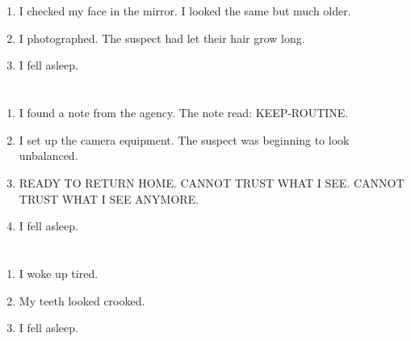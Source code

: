 \documentclass{article}
\begin{document}
    \section{}
    
    \begin{enumerate}
    
    \item I checked my face in the mirror. I looked the same but much older.\\
    
    \item I photographed. The suspect had let their hair grow long.\\
    
    \item I fell asleep.\\
    
    \end{enumerate}
     
    \newpage
    
    \section{}
    
    \begin{enumerate}
    
    \item I found a note from the agency. The note read: KEEP-ROUTINE.\\
    
    \item I set up the camera equipment. The suspect was beginning to look unbalanced.\\
    
    \item READY TO RETURN HOME. CANNOT TRUST WHAT I SEE. CANNOT TRUST WHAT I SEE ANYMORE.\\
    
    \item I fell asleep.\\
    
    \end{enumerate}
     
    \newpage
    
    \section{}
    
    \begin{enumerate}
    
    \item I woke up tired.\\
    
    \item My teeth looked crooked.\\
    
    \item I fell asleep.\\
    
    \end{enumerate}
     
\end{document}
